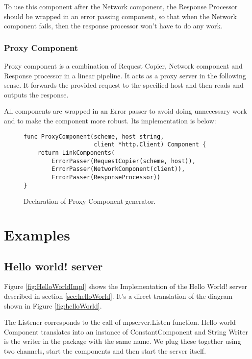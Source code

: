 \documentclass[12pt,a4paper]{article}
\begin{document}
To use this component after the Network component, the Response Processor
should be wrapped in an error passing component, so that when the 
Network component fails, then the response processor won't have to do
any work.

\subsubsection{Proxy Component}
Proxy component is a combination of Request Copier, Network component 
and Response processor in a linear pipeline. It acts as a proxy server
in the following sense. It forwards the provided request to the specified
host and then reads and outputs the response. 

All components are wrapped
in an Error passer to avoid doing unnecessary work and to make the component
more robust. Its implementation is below:

\begin{figure}[h]
\centering
\begin{lstlisting}
func ProxyComponent(scheme, host string, 
					client *http.Client) Component {
	return LinkComponents(
		ErrorPasser(RequestCopier(scheme, host)),
		ErrorPasser(NetworkComponent(client)),
		ErrorPasser(ResponseProcessor))
}
\end{lstlisting}
\caption[scale=1.0]{Declaration of Proxy Component generator.}
\label{fig:ProxyComp}
\end{figure}

\newpage
\section{Examples}
\subsection{Hello world! server}
Figure \ref{fig:HelloWorldImpl} shows the Implementation of the Hello World!
server described in section \ref{sec:helloWorld}.
It's a direct translation of the diagram shown in Figure \ref{fig:helloWorld}.

The Listener corresponds to the call of mpserver.Listen function.
Hello world Component translates into an instance of ConstantComponent
and String Writer is the writer in the package with the same name.
We plug these together using two channels, start the components 
and then start the server itself.
\end{document}
